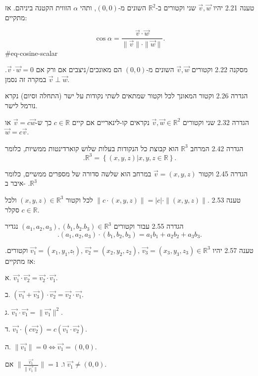 \documentclass[a4paper, 11pt]{article}
\newcommand{\Set}[1]{\left\{#1\right\}}
\begin{document}
\begin{envbox}[thmcolor]{טענה 2.21}
יהיו $\vec{v},\vec{w}$ שני וקטורים ב-$\mathbb{R}^2$ השונים מ-$(0,0)$, ותהי $\alpha$ הזווית הקטנה ביניהם. אז מתקיים:

\[
\cos\alpha = \frac{\vec{v}\cdot\vec{w}}{\|\vec{v}\|\cdot\|\vec{w}\|}.
\]
 {\#eq-cosine-scalar}
\end{envbox}

\begin{envbox}[thmcolor]{מסקנה 2.22}
וקטורים $\vec{v},\vec{w}$ השונים מ-$(0,0)$ הם מאונכים/ניצבים אם ורק אם $\vec{v}\cdot\vec{w}=0$. במקרה זה נסמן $\vec{v}\perp\vec{w}$.
\end{envbox}

\begin{envbox}[defcolor]{הגדרה 2.26}
וקטור המאונך לכל וקטור שמתאים לשתי נקודות על ישר (התחלה וסיום) נקרא נורמל לישר.
\end{envbox}

\begin{envbox}[defcolor]{הגדרה 2.32}
שני וקטורים $\vec{v},\vec{w}\in\mathbb{R}^2$ נקראים קו-לינאריים אם קיים $c\in\mathbb{R}$ כך ש-$\vec{v}=c\vec{w}$ או $\vec{w}=c\vec{v}$.
\end{envbox}

\begin{envbox}[defcolor]{הגדרה 2.42}
המרחב $\mathbb{R}^3$ הוא קבוצת כל הנקודות בעלות שלוש קוארדינטות ממשיות, כלומר 
\[
.\mathbb{R}^3=\Set{(x,y,z)|x,y,z\in\mathbb{R}}.
\]
\end{envbox}

\begin{envbox}[defcolor]{הגדרה 2.45}
וקטור $\vec{v}=(x,y,z)$ במרחב הוא שלשה סדורה של מספרים ממשיים, כלומר איבר ב- $.\mathbb{R}^3$
\end{envbox}

\begin{envbox}[thmcolor]{טענה 2.53}
$\|c\cdot(x,y,z)\|=|c|\cdot\|(x,y,z)\|.$ לכל וקטור $(x,y,z)\in\mathbb{R}^3$ ולכל סקלר $c\in\mathbb{R}$.
\end{envbox}

\begin{envbox}[defcolor]{הגדרה 2.55}
עבור וקטורים $(a_1,a_2,a_3),(b_1,b_2.b_3)\in\mathbb{R}^3$ נגדיר 
\[
.(a_1,a_2,a_3)\cdot(b_1,b_2,b_3)=a_1b_1+a_2b_2+a_3b_3.
\]
\end{envbox}

\begin{envbox}[thmcolor]{טענה 2.57}
יהיו $\vec{v_1}=(x_1,y_1\text{,}z_{!}),\,\vec{v_2}=(x_2,y_2,z_2),\,\vec{v_3}=(x_3,y_3,z_3)\in\mathbb{R}^3$ וקטורים. אז מתקיים:

א. $\vec{v_1}\cdot\vec{v_2}=\vec{v_2}\cdot\vec{v_1}$.

ב. $(\vec{v_1}+\vec{v_3})\cdot\vec{v_2}=\vec{v_2}\cdot\vec{v_1}$.

ג. $\vec{v_1}\cdot\vec{v_1}=\|\vec{v_1}\|^2$.

ד. $\vec{v_1}\cdot(c\vec{v_2})=c(\vec{v_1}\cdot\vec{v_2})$.

ה. ${\|\vec{v_1}\|}=0\iff\vec{v_1}=(0,0)$.

ו. $\|\frac{\vec{v_1}}{\|\vec{v_1}\|}\|=1$ אם $\vec{v_1}\neq(0,0)$.
\end{envbox}
\end{document}
